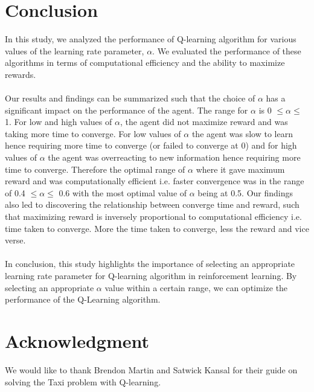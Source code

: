 \documentclass[conference]{IEEEtran}
\begin{document}
\section{Conclusion}
 In this study, we analyzed the performance of Q-learning algorithm for various values of the learning rate parameter, $\alpha$. We evaluated the performance of these algorithms in terms of computational efficiency and the ability to maximize rewards. \\ \\ Our results and findings can be summarized such that the choice of $\alpha$ has a significant impact on the performance of the agent. The range for $\alpha$ is 0 $\leq \alpha \leq$ 1. For low and high values of $\alpha$, the agent did not maximize reward and was taking more time to converge. For low values of $\alpha$ the agent was slow to learn hence requiring more time to converge (or failed to converge at 0) and for high values of $\alpha$ the agent was overreacting to new information hence requiring more time to converge. Therefore the optimal range of $\alpha$ where it gave maximum reward and was computationally efficient i.e. faster convergence was in the range of 0.4  $\leq \alpha \leq$ 0.6 with the most optimal value of $\alpha$ being at 0.5. Our findings also led to discovering the relationship between converge time and reward, such that maximizing reward is inversely proportional to computational efficiency i.e. time taken to converge. More the time taken to converge, less the reward and vice verse. \\ \\ In conclusion, this study highlights the importance of selecting an appropriate learning rate parameter for Q-learning algorithm in reinforcement learning. By selecting an appropriate $\alpha$ value within a certain range, we can optimize the performance of the Q-Learning algorithm. 

\section*{Acknowledgment}
We would like to thank Brendon Martin and Satwick Kansal for their guide \cite{5} on solving the Taxi problem with Q-learning. 
\end{document}

